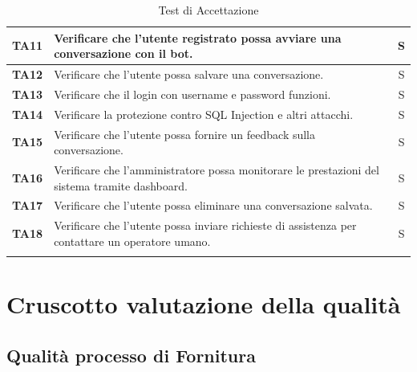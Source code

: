 \documentclass{article}
\begin{document}
\begin{longtable}{|>{\centering\arraybackslash}m{}|>{\raggedright\arraybackslash}m{}|c|}
    \hline
    \textbf{TA11} & Verificare che l’utente registrato possa avviare una conversazione con il bot.& S\\
    \hline
    \textbf{TA12} & Verificare che l’utente possa salvare una conversazione.& S\\
    \hline
    \textbf{TA13} & Verificare che il login con username e password funzioni.& S\\
    \hline
    \textbf{TA14} & Verificare la protezione contro SQL Injection e altri attacchi. & S\\
    \hline
    \textbf{TA15} & Verificare che l’utente possa fornire un feedback sulla conversazione. & S\\
    \hline
    \textbf{TA16} & Verificare che l’amministratore possa monitorare le prestazioni del sistema tramite dashboard. & S\\
    \hline
    \textbf{TA17} & Verificare che l’utente possa eliminare una conversazione salvata.& S\\
    \hline
    \textbf{TA18} & Verificare che l’utente possa inviare richieste di assistenza per contattare un operatore umano.& S\\
    \hline
    \caption{Test di Accettazione}
\end{longtable}


\section{Cruscotto valutazione della qualità}


    \subsection{Qualità processo di Fornitura}
\end{document}
